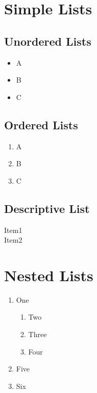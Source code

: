 \documentclass{article}
\begin{document}
\section{Simple Lists}
\subsection{Unordered Lists}
\begin{itemize}
	\item A
	\item B
	\item C
\end{itemize}

\subsection{Ordered Lists}
\begin{enumerate}
	\item A
	\item B
	\item C
\end{enumerate}

\subsection{Descriptive List}
\begin{description}
	\item [Item1] \blindtext
	\item [Item2] \blindtext
\end{description}


\section{Nested Lists}
\begin{enumerate}
	\item One
	\begin{enumerate}
		\item Two
		\item Three
		\item Four
	\end{enumerate}
	\item Five
	\item Six
\end{enumerate}
\end{document}
